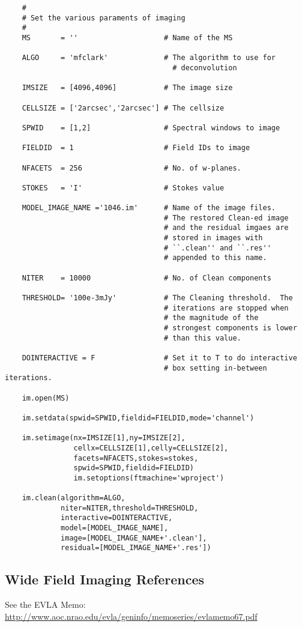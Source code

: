 \small
\begin{verbatim}
    #
    # Set the various paraments of imaging
    #
    MS       = ''                    # Name of the MS

    ALGO     = 'mfclark'             # The algorithm to use for
                                       # deconvolution

    IMSIZE   = [4096,4096]           # The image size

    CELLSIZE = ['2arcsec','2arcsec'] # The cellsize

    SPWID    = [1,2]                 # Spectral windows to image

    FIELDID  = 1                     # Field IDs to image

    NFACETS  = 256                   # No. of w-planes.

    STOKES   = 'I'                   # Stokes value

    MODEL_IMAGE_NAME ='1046.im'      # Name of the image files.
                                     # The restored Clean-ed image
                                     # and the residual imgaes are
                                     # stored in images with
                                     # ``.clean'' and ``.res''
                                     # appended to this name.

    NITER    = 10000                 # No. of Clean components

    THRESHOLD= '100e-3mJy'           # The Cleaning threshold.  The
                                     # iterations are stopped when
                                     # the magnitude of the
                                     # strongest components is lower
                                     # than this value.

    DOINTERACTIVE = F                # Set it to T to do interactive
                                     # box setting in-between iterations.

    im.open(MS)

    im.setdata(spwid=SPWID,fieldid=FIELDID,mode='channel')

    im.setimage(nx=IMSIZE[1],ny=IMSIZE[2],
                cellx=CELLSIZE[1],celly=CELLSIZE[2],
                facets=NFACETS,stokes=stokes,
                spwid=SPWID,fieldid=FIELDID)
                im.setoptions(ftmachine='wproject')

    im.clean(algorithm=ALGO,
             niter=NITER,threshold=THRESHOLD,
             interactive=DOINTERACTIVE,
             model=[MODEL_IMAGE_NAME],
             image=[MODEL_IMAGE_NAME+'.clean'],
             residual=[MODEL_IMAGE_NAME+'.res'])
\end{verbatim}
\normalsize

\subsection{Wide Field Imaging References}
\label{section:imtool.widefield.refs}

See the EVLA Memo: 
\url{http://www.aoc.nrao.edu/evla/geninfo/memoseries/evlamemo67.pdf}

